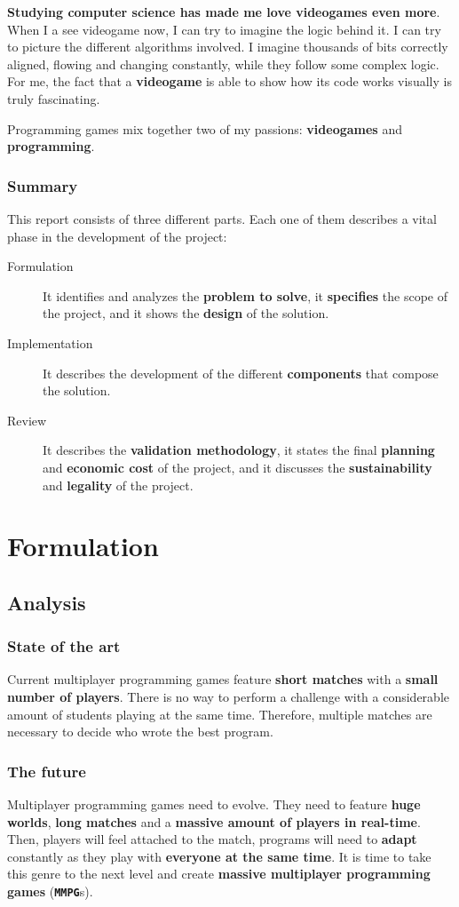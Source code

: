 \documentclass[a4paper,11pt,titlepage,abstract,numbers=noenddot,automark,mnsy,intlimits,rgb,dvipsnames]{report}
\begin{document}
\textbf{Studying computer science has made me love videogames even more}. When I a see videogame now, I can try to
imagine the logic
behind it. I can try to picture the different algorithms involved. I imagine thousands of bits correctly aligned,
flowing and changing constantly, while they follow some complex logic. For me, the fact that a \textbf{videogame} is
able to show how its code works visually is truly fascinating.

Programming games mix together two of my passions: \textbf{videogames} and \textbf{programming}.
\section{Summary}
This report consists of three different parts. Each one of them describes a vital phase in the development of
the project:
\begin{description}
\item[Formulation]
It identifies and analyzes the \textbf{problem to solve}, it \textbf{specifies} the scope of
  the project, and it shows the \textbf{design} of the solution.
\item[Implementation]
It describes the development of the different \textbf{components} that compose the solution.
\item[Review]
It describes the \textbf{validation methodology}, it states the final \textbf{planning} and \textbf{economic cost}
  of the project, and it discusses the \textbf{sustainability} and \textbf{legality} of the project.
\end{description}
\part{Formulation}
\chapter{Analysis}
\section{State of the art}
Current multiplayer programming games feature \textbf{short matches} with a \textbf{small number of players}. There
is no way to perform a challenge with a considerable amount of students playing at the same time. Therefore, multiple
matches are necessary to decide who wrote the best program.
\section{The future}
Multiplayer programming games need to evolve. They need to feature \textbf{huge worlds}, \textbf{long matches} and
a \textbf{massive amount of players in real-time}. Then, players will feel attached to the match, programs will need to
\textbf{adapt} constantly as they play with \textbf{everyone at the same time}. It is time to take this genre to the next level and
create \textbf{massive multiplayer programming games} (\textbf{\texttt{MMPG}}s).
\end{document}
